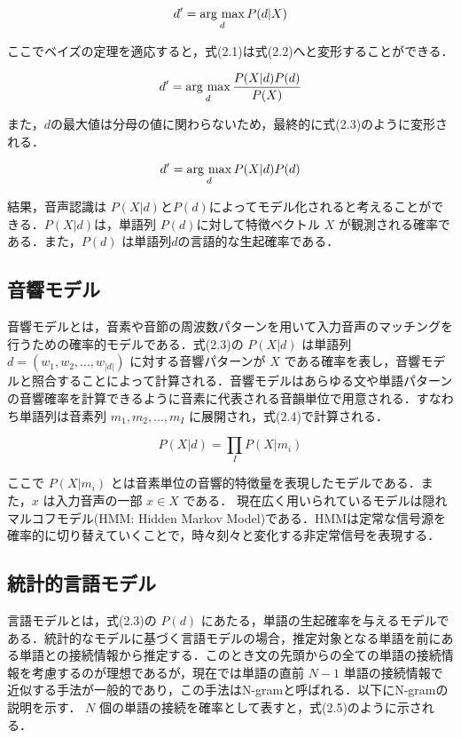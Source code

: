\begin{equation}
    d' = \mathop{\rm arg~max}\limits_{d} P(d|X) 
    \label{onsei_ninsiki1}
\end{equation}

ここでベイズの定理を適応すると，式(2.1)は式(2.2)へと変形することができる．

\begin{equation}
    d' = \mathop{\rm arg~max}\limits_{d}  \frac{P(X|d)P(d)}{P(X)} 
    \label{onsei_ninsiki2}
\end{equation}

また，$d$の最大値は分母の値に関わらないため，最終的に式(2.3)のように変形される．

\begin{equation}
    d' = \mathop{\rm arg~max}\limits_{d}  P(X|d)P(d) 
    \label{onsei_ninsiki3}
\end{equation}

結果，音声認識は $P(X|d)$と$P(d)$によってモデル化されると考えることができる．$P(X|d)$は，単語列 $P(d)$に対して特徴ベクトル $X$ が観測される確率である．また，$P(d)$ は単語列$d$の言語的な生起確率である．

\subsection{音響モデル}
音響モデルとは，音素や音節の周波数パターンを用いて入力音声のマッチングを行うための確率的モデルである．式(2.3)の $P(X|d)$ は単語列 $d = (w_1, w_2, ..., w_{|d|})$ に対する音響パターンが $X$ である確率を表し，音響モデルと照合することによって計算される．音響モデルはあらゆる文や単語パターンの音響確率を計算できるように音素に代表される音韻単位で用意される．すなわち単語列は音素列 $m_1, m_2, ... , m_I $ に展開され，式(2.4)で計算される．

\begin{equation}
    P(X|d) = \prod_{I}  P(X|m_i) 
    \label{onkyo_model1}
\end{equation}

ここで $P(X|m_i)$ とは音素単位の音響的特徴量を表現したモデルである．また，$x$ は入力音声の一部 $x \in X$ である．
現在広く用いられているモデルは隠れマルコフモデル(HMM: Hidden Markov Model)である．HMMは定常な信号源を確率的に切り替えていくことで，時々刻々と変化する非定常信号を表現する．

\subsection{統計的言語モデル}

言語モデルとは，式(2.3)の $P(d)$ にあたる，単語の生起確率を与えるモデルである．統計的なモデルに基づく言語モデルの場合，推定対象となる単語を前にある単語との接続情報から推定する．このとき文の先頭からの全ての単語の接続情報を考慮するのが理想であるが，現在では単語の直前 $N-1$ 単語の接続情報で近似する手法が一般的であり，この手法はN-gramと呼ばれる．以下にN-gramの説明を示す． 
 $N$ 個の単語の接続を確率として表すと，式(2.5)のように示される．

